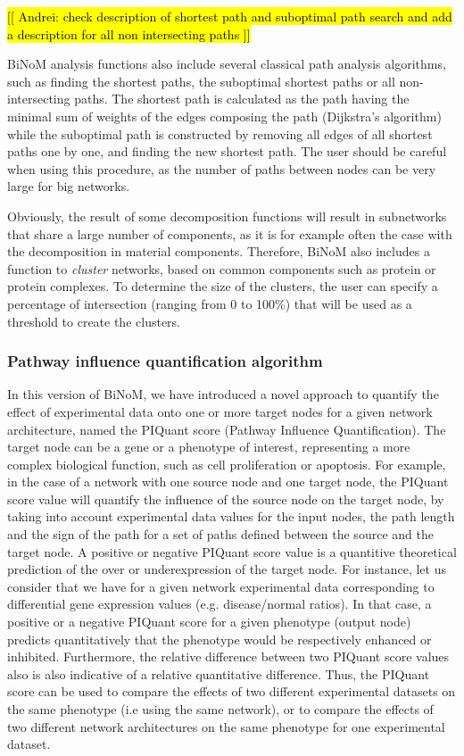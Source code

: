 \documentclass[10pt]{bmc_article}
\newenvironment{bmcformat}{\baselineskip20pt\sloppy\setboolean{publ}{false}}{\baselineskip20pt\sloppy}
\begin{document}
\begin{bmcformat}
\hl{[[ Andrei: check description of shortest path and suboptimal path search and add a description for all non intersecting paths ]]}

BiNoM analysis functions also include several classical path analysis
algorithms, such as finding the shortest paths, the suboptimal shortest paths or
all non-intersecting paths. The shortest path is calculated as the path having
the minimal sum of weights of the edges composing the path (Dijkstra's
algorithm) while the suboptimal path is constructed by removing all edges of
all shortest paths one by one, and finding the new shortest path. The user should
be careful when using this procedure, as the number of paths between nodes can be
very large for big networks.

Obviously, the result of some decomposition functions will result in subnetworks
that share a large number of components, as it is for example often the case
with the decomposition in material components. Therefore, BiNoM also includes a
function to \emph{cluster} networks, based on common components such as protein
or protein complexes. To determine the size of the clusters, the user can
specify a percentage of intersection (ranging from 0 to 100\%) that will be used
as a threshold to create the clusters.

\subsubsection*{Pathway influence quantification algorithm}

In this version of BiNoM, we have introduced a novel approach to quantify the
effect of experimental data onto one or more target nodes for a given
network architecture, named the PIQuant score (Pathway Influence Quantification). 
The target node can be a gene or a phenotype of interest, representing a more complex
biological function, such as cell proliferation or apoptosis. 
For example, in the case of a network 
with one source node and one target node,
the PIQuant score value will quantify the influence of the source node on the target
node, by taking into account experimental data values for the input nodes,
the path length and the sign of the path for a set of paths defined between the
source and the target node.
A positive or negative PIQuant score value is a quantitive theoretical
prediction of the over or underexpression of 
the target node. For instance, let us consider that we have for a given network
experimental data corresponding to differential gene expression values (e.g.
disease/normal ratios).  
In that case, a positive or a negative PIQuant score for a given phenotype
(output node) predicts quantitatively
that the phenotype would be respectively enhanced or inhibited. Furthermore, the
relative difference between two PIQuant score values also is also indicative of
a relative quantitative difference. Thus, the PIQuant score can be used to
compare the effects of two different experimental datasets on the same phenotype
(i.e using the same network), or to compare the effects of two different network
architectures on the same phenotype for one experimental dataset.



\end{bmcformat}
\end{document}
